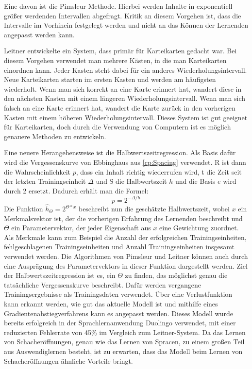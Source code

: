 Eine davon ist die Pimsleur Methode. Hierbei werden Inhalte in exponentiell größer werdenden Intervallen abgefragt. Kritik an diesem Vorgehen ist, dass die Intervalle im Vorhinein festgelegt werden und nicht an das Können der Lernenden angepasst werden kann.

Leitner \cite{leitner_so_1973} entwickelte ein System, dass primär für Karteikarten gedacht war. Bei diesem Vorgehen verwendet man mehrere Kästen, in die man Karteikarten einordnen kann. Jeder Kasten steht dabei für ein anderes Wiederholungsintervall. Neue Karteikarten starten im ersten Kasten und werden am häufigsten wiederholt. Wenn man sich korrekt an eine Karte erinnert hat, wandert diese in den nächsten Kasten mit einem längeren Wiederholungsintervall. Wenn man sich falsch an eine Karte erinnert hat, wandert die Karte zurück in den vorherigen Kasten mit einem höheren Wiederholungsintervall. Dieses System ist gut geeignet für Karteikarten, doch durch die Verwendung von Computern ist es möglich genauere Methoden zu entwickeln.

Eine neuere Herangehensweise ist die Halbwertszeitregression. Als Basis dafür wird die Vergessenskurve von Ebbinghaus aus \autoref{cp:Spacing} verwendet. R ist dann die Wahrscheinlichkeit $p$, dass ein Inhalt richtig wiederrufen wird, t die Zeit seit der letzten Trainingseinheit $\Delta$ und S die Halbwertszeit $h$ und die Basis $e$ wird durch 2 ersetzt. Dadurch erhält man die Formel:
$$p = 2^{-\Delta/h}$$
Die Funktion $\hat{h}_\Theta = 2^{\Theta*x}$ beschreibt nun die geschätzte Halbwertszeit, wobei $x$ ein Merkmalsvektor ist, der die vorherigen Erfahrung des Lernenden beschreibt und $\Theta$ ein Parametervektor, der jeder Eigenschaft aus $x$ eine Gewichtung zuordnet. Als Merkmale kann zum Beispiel die Anzahl der erfolgreichen Trainingseinheiten, fehlgeschlagenen Trainingseinheiten und Anzahl Trainingseinheiten insgesamt verwendet werden. Die Algorithmen von Pimsleur und Leitner können auch durch eine Ausprägung des Parametervektors in dieser Funktion dargestellt werden. Ziel der Halbwertszeitregression ist es, ein $\Theta$ zu finden, das möglichst genau die tatsächliche Vergessenskurve beschreibt. Dafür werden vergangene Trainingsergebnisse als Trainingsdaten verwendet. Über eine Verlustfunktion kann erkannt werden, wie gut das aktuelle Modell ist und mithilfe eines Gradientenabstiegverfahrens kann es angepasst werden. Dieses Modell wurde bereits erfolgreich in der Sprachlernanwendung Duolingo verwendet, mit einer reduzierten Fehlerrate von 45\% im Vergleich zum Leitner-System. Da das Lernen von Schacheröffnungen, genau wie das Lernen von Spracen, zu einem großen Teil aus Auswendiglernen besteht, ist zu erwarten, dass das Modell beim Lernen von Schacheröffnungen ähnliche Vorteile bringt.
\cite{settles_trainable_2016}

